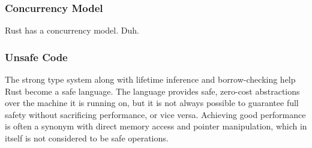 

\subsubsection{Concurrency Model} %
\label{ssub:concurrency_model}

Rust has a concurrency model. Duh.


\subsubsection{Unsafe Code} %
\label{ssub:unsafe_code}

The strong type system along with lifetime inference and borrow-checking help Rust become a safe
language. The language provides safe, zero-cost abstractions over the machine it is running on, but
it is not always possible to guarantee full safety without sacrificing performance, or vice versa.
Achieving good performance is often a synonym with direct memory access and pointer manipulation,
which  in itself is not considered to be safe operations. 




